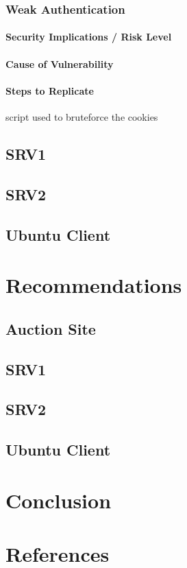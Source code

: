 \documentclass{report}
\begin{document}
\subsection{Weak Authentication}
\subsubsection{Security Implications / Risk Level}
\subsubsection{Cause of Vulnerability}
\subsubsection{Steps to Replicate}
script used to bruteforce the cookies
\section{SRV1}
\section{SRV2}
\section{Ubuntu Client}

\chapter{Recommendations}
\section{Auction Site}
\section{SRV1}
\section{SRV2}
\section{Ubuntu Client}

\chapter{Conclusion}

\chapter{References}
\end{document}
